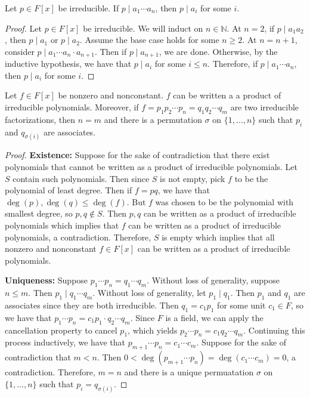 \documentclass [12pt] {article}
\newcommand{\N}{\mathbb{N}}
\newenvironment{theorem}[1]{\begin{tcolorbox}[title={Theorem #1},colback=green!5!white,colframe=black!75!green]}{\end{tcolorbox}}
\newenvironment{corollary}[1]{\begin{tcolorbox}[title={Corollary #1}]}{\end{tcolorbox}}
\renewcommand{\bf}[1]{\textbf{{#1}}}
\begin{document}
\begin{corollary}{}
    Let $p \in F[x]$ be irreducible. If $p \mid a_1 \cdots a_n$, then $p \mid a_i$ for some $i$.
\end{corollary}
\begin{proof}
    Let $p \in F[x]$ be irreducible. We will induct on $n \in \N$. At $n = 2$, if $p \mid a_1 a_2$,
    then $p \mid a_1$ or $p \mid a_2$. Assume the base case holds for some $n \geq 2$. At $n = n + 1$,
    consider $p \mid a_1 \cdots a_n \cdot a_{n + 1}$. Then  if $p \mid a_{n + 1}$, we are done.
    Otherwise, by the inductive hypothesis, we have that $p \mid a_i$ for some $i \leq n$.
    Therefore, if $p \mid a_1 \cdots a_n$, then $p \mid a_i$ for some $i$.
\end{proof}

\begin{theorem}{(Unique Factorization [Polynomials])}
    Let $f \in F[x]$ be nonzero and nonconstant. $f$ can be written a a product of irreducible
    polynomials. Moreover, if $f = p_1 p_2 \cdots p_n = q_1 q_2 \cdots q_m$ are two irreducible
    factorizations, then $n = m$ and there is a permutation $\sigma$ on $\{1, \ldots, n\}$ such that
    $p_i$ and $q_{\sigma(i)}$ are associates.
\end{theorem}
\begin{proof}
    \bf{Existence:}
    Suppose for the sake of contradiction that there exist polynomials that cannot be written as a
    product of irreducible polynomials. Let $S$ contain such polynomials. Then since $S$ is not
    empty, pick $f$ to be the polynomial of least degree. Then if $f = pq$, we have that
    $\deg(p), \deg(q) \leq \deg(f)$. But $f$ was chosen to be the polynomial with smallest degree,
    so $p, q \not \in S$. Then $p, q$ can be written as a product of irreducible polynomials which
    implies that $f$ can be written as a product of irreducible polynomials, a contradiction.
    Therefore, $S$ is empty which implies that all nonzero and nonconstant $f \in F[x]$ can be
    written as a product of irreducible polynomials.
    \vspace{0.5em}

    \bf{Uniqueness:}
    Suppose $p_1 \cdots p_n = q_1 \cdots q_m$. Without loss of generality, suppose $n \leq m$. Then
    $p_1 \mid q_1 \cdots q_m$. Without loss of generality, let $p_1 \mid q_1$. Then $p_1$ and $q_1$
    are associates since they are both irreducible. Then $q_1 = c_1 p_1$ for some unit $c_1 \in F$,
    so we have that $p_1 \cdots p_n = c_1 p_1 \cdot q_2 \cdots q_m$. Since $F$ is a field, we can apply
    the cancellation property to cancel $p_1$, which yields $p_2 \cdots p_n = c_1 q_2 \cdots q_m$.
    Continuing this process inductively, we have that $p_{m + 1} \cdots p_n = c_1 \cdots c_m$.
    Suppose for the sake of contradiction that $m < n$. Then
    $0 < \deg(p_{m + 1} \cdots p_n) = \deg(c_1 \cdots c_m) = 0$, a contradiction. Therefore,
    $m = n$ and there is a unique permuatation $\sigma$ on $\{ 1, \ldots, n \}$ such that
    $p_i = q_{\sigma(i)}$.
\end{proof}
\end{document}
